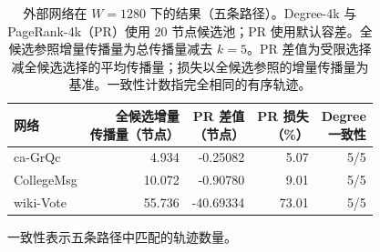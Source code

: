 \begin{table}[htbp]
\caption{外部网络在 $W=1280$ 下的结果（五条路径）。Degree-4k 与 PageRank-4k（PR）使用 20 节点候选池；PR 使用默认容差。全候选参照增量传播量为总传播量减去 $k=5$。PR 差值为受限选择减全候选选择的平均传播量；损失以全候选参照的增量传播量为基准。一致性计数指完全相同的有序轨迹。}\label{tab:primary}
\begin{tabular}{lrrrr}
\toprule
网络 & \shortstack{全候选增量\\传播量（节点）} & \shortstack{PR 差值\\（节点）} & \shortstack{PR 损失\\（\%）} & \shortstack{Degree\\一致性} \\
\midrule
ca-GrQc & 4.934 & -0.25082 & 5.07 & 5/5 \\
CollegeMsg & 10.072 & -0.90780 & 9.01 & 5/5 \\
wiki-Vote & 55.736 & -40.69334 & 73.01 & 5/5 \\
\bottomrule
\end{tabular}
\par\smallskip\footnotesize 一致性表示五条路径中匹配的轨迹数量。
\end{table}
